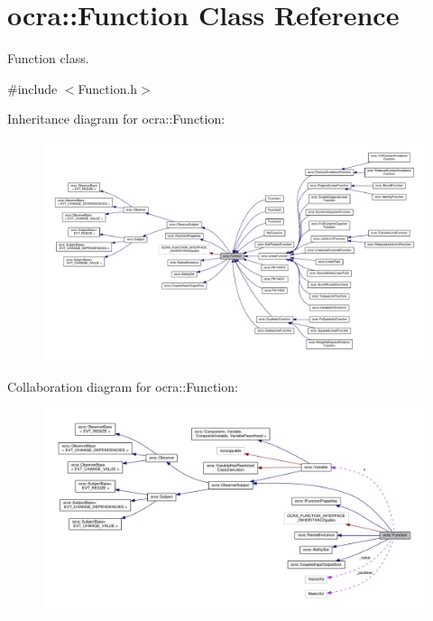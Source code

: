 \hypertarget{classocra_1_1Function}{}\section{ocra\+:\+:Function Class Reference}
\label{classocra_1_1Function}


Function class.  




{\ttfamily \#include $<$Function.\+h$>$}



Inheritance diagram for ocra\+:\+:Function\+:
\nopagebreak
\begin{figure}[H]
\begin{center}
\leavevmode
\includegraphics[width=350pt]{da/d72/classocra_1_1Function__inherit__graph}
\end{center}
\end{figure}


Collaboration diagram for ocra\+:\+:Function\+:
\nopagebreak
\begin{figure}[H]
\begin{center}
\leavevmode
\includegraphics[width=350pt]{d5/d4a/classocra_1_1Function__coll__graph}
\end{center}
\end{figure}
